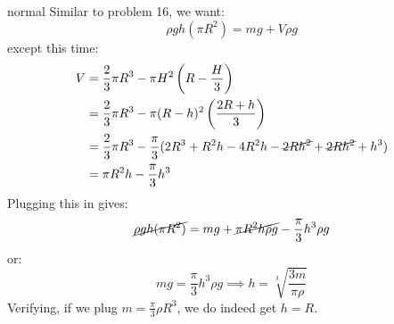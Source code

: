 \begin{solution}{normal}
Similar to problem 16, we want:
$$\rho gh(\pi R^2) = mg + V\rho g$$
except this time:
\begin{align*}
V &= \frac{2}{3}\pi R^3 - \pi H^2\left(R-\frac{H}{3}\right) \\
&= \frac{2}{3}\pi R^3 - \pi (R-h)^2\left(\frac{2R+h}{3}\right) \\
&= \frac{2}{3}\pi R^3 - \frac{\pi}{3} (2R^3+R^2h-4R^2h-\cancel{2Rh^2}+\cancel{2Rh^2}+h^3) \\
&= \pi R^2h - \frac{\pi}{3}h^3
\end{align*}
Plugging this in gives:
$$\cancel{\rho gh(\pi R^2)} = mg +  \cancel{\pi R^2h\rho g} - \frac{\pi}{3}h^3\rho g$$
or:
$$mg = \frac{\pi}{3}h^3\rho g \implies \boxed{h = \sqrt[3]{\frac{3m}{\pi \rho}}}$$
Verifying, if we plug $m=\frac{\pi}{3}\rho R^3$, we do indeed get $h=R$.
\end{solution}
